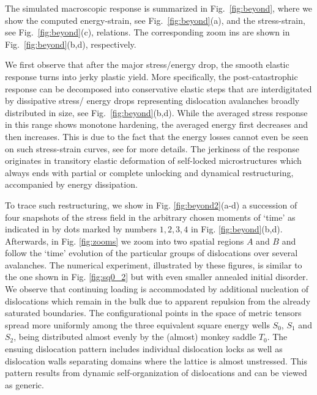 \documentclass[CRPHYS,Unicode,manuscript]{cedram}
\begin{document}
% 

%


The simulated macroscopic response is  summarized in  Fig.~\ref{fig:beyond}, where we show the computed  energy-strain, see  Fig.~\ref{fig:beyond}(a),  and the stress-strain, see Fig.~\ref{fig:beyond}(c),  relations. The corresponding zoom ins are shown in Fig.~\ref{fig:beyond}(b,d), respectively. 

We first observe that after the major stress/energy drop, the smooth elastic response turns into jerky plastic yield. More specifically, the post-catastrophic response can be decomposed into conservative elastic steps that are interdigitated by dissipative stress/ energy drops representing dislocation avalanches broadly distributed in size, see Fig.~\ref{fig:beyond}(b,d). While the averaged stress response in this range shows monotone hardening, the averaged energy first decreases and then increases. This is due to the fact that the energy losses cannot even be seen on such stress-strain curves, see \cite{Puglisi2005-lg} for more details. The jerkiness of the response originates in transitory elastic deformation of self-locked microstructures which always ends with partial or complete unlocking and dynamical restructuring, accompanied by energy dissipation.

To trace such restructuring,   we show in  Fig. \ref{fig:beyond2}(a-d) a succession of four snapshots of the stress field in the arbitrary chosen moments of `time'  as   indicated in by dots  marked by numbers $1, 2, 3, 4$ in Fig. \ref{fig:beyond}(b,d). Afterwards, in Fig. \ref{fig:zooms} we zoom into two spatial regions $A$ and $B$  and follow  the `time'  evolution of  the particular  groups of dislocations over several avalanches.  The numerical experiment, illustrated by these figures,  is similar to the one   shown in Fig.  \ref{fig:sq0_2}  but with even smaller annealed initial disorder. We observe that continuing  loading is accommodated   by  additional nucleation of dislocations which remain in the bulk due to apparent repulsion from the already saturated boundaries.  The configurational points in the space of metric tensors spread more uniformly among the three equivalent square energy wells $S_0$, $S_1$ and $S_2$, being distributed almost evenly by the (almost) monkey saddle $T_0$. The ensuing  dislocation pattern includes  individual dislocation locks as well as dislocation walls separating domains where the  lattice is almost unstressed. This pattern  results from dynamic self-organization of dislocations and can be  viewed as generic.
  
\end{document}
